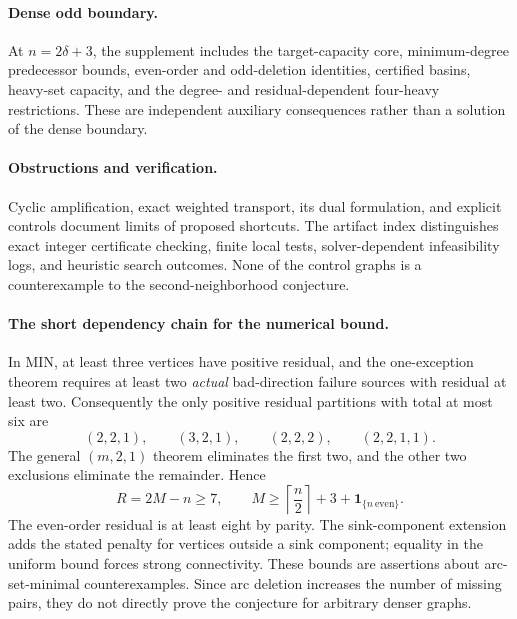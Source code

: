 \paragraph{Dense odd boundary.}
At \(n=2\delta+3\), the supplement includes the target-capacity core,
minimum-degree predecessor bounds, even-order and odd-deletion
identities, certified basins, heavy-set capacity, and the degree- and
residual-dependent four-heavy restrictions. These are independent
auxiliary consequences rather than a solution of the dense boundary.

\paragraph{Obstructions and verification.}
Cyclic amplification, exact weighted transport, its dual formulation,
and explicit controls document limits of proposed shortcuts. The
artifact index distinguishes exact integer certificate checking,
finite local tests, solver-dependent infeasibility logs, and heuristic
search outcomes. None of the control graphs is a counterexample to the
second-neighborhood conjecture.

\paragraph{The short dependency chain for the numerical bound.}
In MIN, at least three vertices have positive residual, and the
one-exception theorem requires at least two \emph{actual} bad-direction
failure sources with residual at least two. Consequently the only
positive residual partitions with total at most six are
\[
 (2,2,1),\qquad(3,2,1),\qquad(2,2,2),\qquad(2,2,1,1).
\]
The general \((m,2,1)\) theorem eliminates the first two, and the other
two exclusions eliminate the remainder. Hence
\[
 R=2M-n\ge7,\qquad
 M\ge\left\lceil\frac n2\right\rceil+3+
       \mathbf1_{\{n\ \mathrm{even}\}}.
\]
The even-order residual is at least eight by parity. The sink-component
extension adds the stated penalty for vertices outside a sink component;
equality in the uniform bound forces strong connectivity. These bounds
are assertions about arc-set-minimal counterexamples. Since arc deletion
increases the number of missing pairs, they do not directly prove the
conjecture for arbitrary denser graphs.

